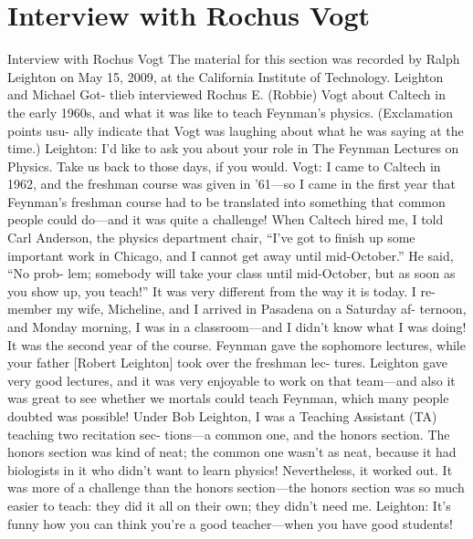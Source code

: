 \documentclass[10pt,oneside]{article}
\begin{document}
\section*{Interview with Rochus Vogt}
\label{tips-sec-8-interview-with-rochus-vogt}
Interview with Rochus Vogt The material for this section was recorded by Ralph Leighton on May 15, 2009, at the California Institute of Technology. Leighton and Michael Got- tlieb interviewed Rochus E. (Robbie) Vogt about Caltech in the early 1960s, and what it was like to teach Feynman’s physics. (Exclamation points usu- ally indicate that Vogt was laughing about what he was saying at the time.) Leighton: I’d like to ask you about your role in The Feynman Lectures on Physics. Take us back to those days, if you would. Vogt: I came to Caltech in 1962, and the freshman course was given in ’61---so I came in the first year that Feynman’s freshman course had to be translated into something that common people could do---and it was quite a challenge! When Caltech hired me, I told Carl Anderson, the physics department chair, “I’ve got to finish up some important work in Chicago, and I cannot get away until mid-October.” He said, “No prob- lem; somebody will take your class until mid-October, but as soon as you show up, you teach!” It was very different from the way it is today. I re- member my wife, Micheline, and I arrived in Pasadena on a Saturday af- ternoon, and Monday morning, I was in a classroom---and I didn’t know what I was doing! It was the second year of the course. Feynman gave the sophomore lectures, while your father [Robert Leighton] took over the freshman lec- tures. Leighton gave very good lectures, and it was very enjoyable to work on that team---and also it was great to see whether we mortals could teach Feynman, which many people doubted was possible! Under Bob Leighton, I was a Teaching Assistant (TA) teaching two recitation sec- tions---a common one, and the honors section. The honors section was kind of neat; the common one wasn’t as neat, because it had biologists in it who didn’t want to learn physics! Nevertheless, it worked out. It was more of a challenge than the honors section---the honors section was so much easier to teach: they did it all on their own; they didn’t need me. Leighton: It’s funny how you can think you’re a good teacher---when you have good students!\par
\end{document}
